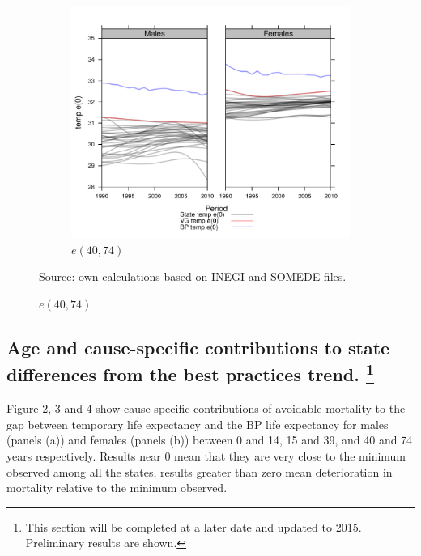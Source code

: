 \documentclass{article}
\begin{document}
\begin{spacing}{1.5}
\begin{figure}
\begin{subfigure}{\textwidth}
\end{subfigure}
\\
\begin{subfigure}{\textwidth}
\centering
\caption{$e(40,74)$}
\vspace{-2em}
\label{fig:e40_74}
\includegraphics[scale=.5]{Figures/et40_74s.pdf}
\end{subfigure}
Source: own calculations based on INEGI and SOMEDE files. 
\end{figure}



\subsection*{Age and cause-specific contributions to state differences from the best
practices trend. \footnote{This section will be completed at a later date and updated to 2015. Preliminary results are shown.
}}

Figure 2, 3 and 4  show cause-specific contributions of avoidable mortality to the gap between temporary life expectancy and the BP life expectancy for males (panels (a))  and females (panels (b)) between 0 and 14, 15 and 39, and 40 and 74 years respectively. Results near 0 mean that they are very close to the minimum observed among all the states, results greater than zero mean deterioration in mortality relative to the minimum observed. 


\end{spacing}
\end{document}
